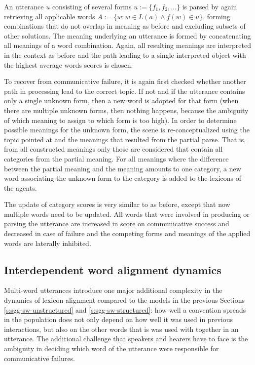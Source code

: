  An utterance $u$ consisting
of several forms $u := \{f_1, f_2, \dots\}$ is parsed by again
retrieving all applicable words $A:=\{w: w \in L(a) \wedge f(w) \in
u\}$, forming combinations that do not overlap in meaning as before
and excluding subsets of other solutions. The meaning underlying an
utterance is formed by concatenating all meanings of a word
combination. Again, all resulting meanings are interpreted in the
context as before and the path leading to a single interpreted object
with the highest average words scores is chosen.

 To recover
from communicative failure, it is again first checked whether another
path in processing lead to the correct topic. If not and if the
utterance contains only a single unknown form, then a new word is
adopted for that form (when there are multiple unknown forms, then
nothing happens, because the ambiguity of which meaning to assign to
which form is too high). In order to determine possible meanings for
the unknown form, the scene is re-conceptualized using the topic
pointed at and the meanings that resulted from the partial parse. That
is, from all constructed meanings only those are considered that
contain all categories from the partial meaning. For all meanings
where the difference between the partial meaning and the meaning
amounts to one category, a new word associating the unknown form to
the category is added to the lexicons of the agents.

The update of category scores is very similar to as before, except
that now multiple words need to be updated. All words that were
involved in producing or parsing the utterance are increased in score
on communicative success and decreased in case of failure and the
competing forms and meanings of the applied words are laterally
inhibited.


\subsection{Interdependent word alignment dynamics}


Multi-word utterances introduce one major additional complexity in the
dynamics of lexicon alignment compared to the models in the previous
Sections \ref{s:sgg-sw-unstructured} and \ref{s:sgg-sw-structured}:
how well a convention spreads in the population does not only depend
on how well it was used in previous interactions, but also on the
other words that is was used with together in an utterance. The
additional challenge that speakers and hearers have to face is the
ambiguity in deciding which word of the utterance were responsible for
communicative failures. 


